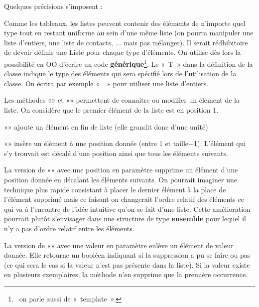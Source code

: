 \bigskip

Quelques précisions s’imposent :

\begin{liste}
	\item 
		Comme les tableaux, les listes peuvent contenir des éléments de
		n’importe quel type tout en restant uniforme au sein d’une même liste
		(on pourra manipuler une liste d’entiers, une liste de contacts, ...
		mais pas mélanger). Il serait rédhibitoire de devoir définir une Liste
		pour chaque type d’éléments. On utilise dès lors la possibilité en OO
		d’écrire un code \textbf{générique}\footnote{\ on parle aussi de
		«~template~».}. Le «~T~» dans la définition de la classe indique le
		type des éléments qui sera spécifié lors de l’utilisation de la classe.
		On écrira par exemple «~~» pour
		utiliser une liste d’entiers.
	\item 
		Les méthodes «» et «»
		permettent de connaitre ou modifier un élément de la liste. On
		considère que le premier élément de la liste est en position 1.
	\item 
		«» ajoute un élément en fin de liste (elle
		grandit donc d’une unité)
	\item 
		«» insère un élément à une position donnée
		(entre 1 et taille+1). L’élément qui s’y trouvait est décalé
		d'une position ainsi que tous les éléments suivants.
	\item 
		La version de «» avec une position en
		paramètre supprime un élément d'une position donnée en
		décalant les éléments suivants. On pourrait imaginer une technique plus
		rapide consistant à placer le dernier élément à la place de l’élément
		supprimé mais ce faisant on changerait l’ordre relatif des éléments ce
		qui va à l’encontre de l’idée intuitive qu’on se fait d’une liste.
		Cette amélioration pourrait plutôt s’envisager dans une structure de
		type \textbf{ensemble} pour lequel il n’y a pas d’ordre relatif entre
		les éléments.
	\item 
		La version de «» avec une valeur en
		paramètre enlève un élément de valeur donnée. Elle retourne un booléen
		indiquant si la suppression a pu se faire ou pas (ce qui sera le cas si
		la valeur n’est pas présente dans la liste). Si la valeur existe en
		plusieurs exemplaires, la méthode n’en supprime que la première
		occurrence.
	\item 

\end{liste}
